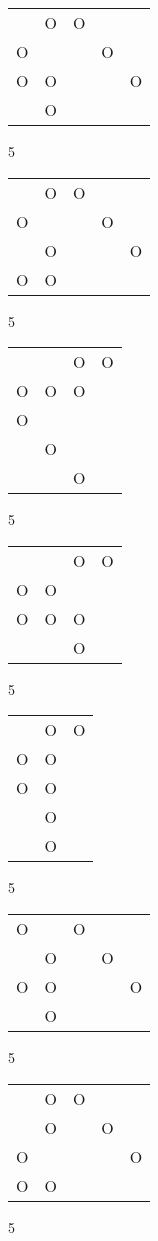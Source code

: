 \begin{tabular}{|m{0.2cm}m{0.2cm}m{0.2cm}m{0.2cm}m{0.2cm}|}\hline
 &O&O& & \\
O& & &O& \\
O&O& & &O\\
 &O& & & \\
\hline\end{tabular}5
\begin{tabular}{|m{0.2cm}m{0.2cm}m{0.2cm}m{0.2cm}m{0.2cm}|}\hline
 &O&O& & \\
O& & &O& \\
 &O& & &O\\
O&O& & & \\
\hline\end{tabular}5
\begin{tabular}{|m{0.2cm}m{0.2cm}m{0.2cm}m{0.2cm}|}\hline
 & &O&O\\
O&O&O& \\
O& & & \\
 &O& & \\
 & &O& \\
\hline\end{tabular}5
\begin{tabular}{|m{0.2cm}m{0.2cm}m{0.2cm}m{0.2cm}|}\hline
 & &O&O\\
O&O& & \\
O&O&O& \\
 & &O& \\
\hline\end{tabular}5
\begin{tabular}{|m{0.2cm}m{0.2cm}m{0.2cm}|}\hline
 &O&O\\
O&O& \\
O&O& \\
 &O& \\
 &O& \\
\hline\end{tabular}5
\begin{tabular}{|m{0.2cm}m{0.2cm}m{0.2cm}m{0.2cm}m{0.2cm}|}\hline
O& &O& & \\
 &O& &O& \\
O&O& & &O\\
 &O& & & \\
\hline\end{tabular}5
\begin{tabular}{|m{0.2cm}m{0.2cm}m{0.2cm}m{0.2cm}m{0.2cm}|}\hline
 &O&O& & \\
 &O& &O& \\
O& & & &O\\
O&O& & & \\
\hline\end{tabular}5
